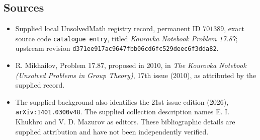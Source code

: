 \documentclass[11pt]{article}
\begin{document}
\subsection{Sources}
\begin{itemize}
\item Supplied local UnsolvedMath registry record, permanent ID \(701389\), exact source code \texttt{catalogue entry}, titled \emph{Kourovka Notebook Problem 17.87}; upstream revision \texttt{d371ee917ac9647fbb06cd6fc529deec6f3dda82}.
\item R. Mikhailov, Problem 17.87, proposed in 2010, in \emph{The Kourovka Notebook (Unsolved Problems in Group Theory)}, 17th issue (2010), as attributed by the supplied record.
\item The supplied background also identifies the 21st issue edition (2026), \texttt{arXiv:1401.0300v48}. The supplied collection description names E. I. Khukhro and V. D. Mazurov as editors. These bibliographic details are supplied attribution and have not been independently verified.
\end{itemize}
\end{document}
